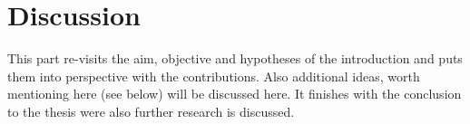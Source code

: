 \chapter*{Discussion}
\label{ch:discussion}

This part re-visits the aim, objective and hypotheses of the introduction and puts them into perspective with the contributions. Also additional ideas, worth mentioning here (see below) will be discussed here. It finishes with the conclusion to the thesis were also further research is discussed.








